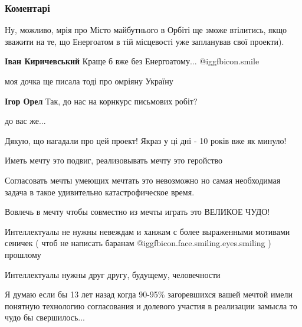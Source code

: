  
 
 
 
 
\subsubsection{Коментарі}

\begin{itemize} %

Ну, можливо, мрія про Місто майбутнього в Орбіті ще зможе втілитись, якщо
зважити на те, що Енергоатом в тій місцевості уже запланував свої проекти).

\textbf{Іван Киричевський} Краще б вже без Енергоатому...  @igg{fbicon.smile} 

моя дочка ще писала тоді про омріяну Україну

\begin{itemize} %
\textbf{Ігор Орел} Так, до нас на корнкурс письмових робіт?

до вас же...

Дякую, що нагадали про цей проект! Якраз у ці дні - 10 років вже як минуло!
\end{itemize} %


Иметь мечту это подвиг, реализовывать мечту это геройство

Согласовать мечты умеющих мечтать это невозможно но самая необходимая задача в
такое удивительно катастрофическое время.

Вовлечь в мечту чтобы совместно из мечты играть это ВЕЛИКОЕ ЧУДО!

Интеллектуалы не нужны невеждам и ханжам с более выраженными мотивами сеничек (
чтоб не написать баранам  @igg{fbicon.face.smiling.eyes.smiling} ) прошлому

Интеллектуалы нужны друг другу, будущему, человечности

Я думаю если бы 13 лет назад когда 90-95\% загоревшихся вашей мечтой имели
понятную технологию согласования и долевого участия в реализации замысла то
чудо бы свершилось...


\end{itemize}
